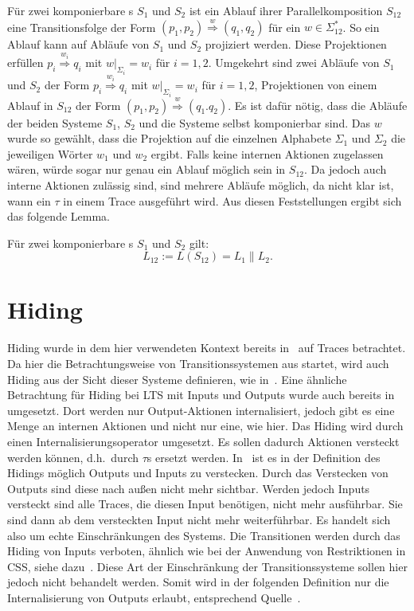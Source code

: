 Für zwei komponierbare \EIO{}s $S_1$ und $S_2$ ist ein Ablauf ihrer
Parallelkomposition $S_{12}$ eine Transitionsfolge der Form $(p_1,p_2)
\overset{w}{\Rightarrow} (q_1,q_2)$ für ein $w\in\Sigma_{12}^*$. So ein Ablauf
kann auf Abläufe von $S_1$ und $S_2$ projiziert werden. Diese Projektionen
erfüllen $p_i \overset{w_i}{\Rightarrow} q_i$ mit $w|_{\Sigma
_i}=w_i$ für $i=1,2$. Umgekehrt sind zwei Abläufe von $S_1$ und $S_2$ der Form
$p_i \overset{w_i}{\Rightarrow} q_i$ mit $w| _{\Sigma _i}= w_i$ für $i=1,2$,
Projektionen von einem Ablauf in $S_{12}$ der Form $(p_1,p_2)
\overset{w}{\Rightarrow} (q_1.q_2)$. Es ist dafür nötig, dass die Abläufe der
beiden Systeme $S_1$, $S_2$ und die Systeme selbst komponierbar sind. Das $w$ wurde so
gewählt, dass die Projektion auf die einzelnen Alphabete $\Sigma _1$ und $\Sigma
_2$ die jeweiligen Wörter $w_1$ und $w_2$ ergibt. Falls keine internen Aktionen
zugelassen wären, würde sogar nur genau ein Ablauf möglich sein in $S_{12}$. Da
jedoch auch interne Aktionen zulässig sind, sind mehrere Abläufe möglich, da
nicht klar ist, wann ein $\tau$ in einem Trace ausgeführt wird. Aus diesen
Feststellungen ergibt sich das folgende Lemma.

\begin{lem}
\label{LemmaSprache}
  Für zwei komponierbare \EIO{}s $S_1$ und $S_2$ gilt: \[L_{12} := L(S_{12}) =
  L_1\|L_2.\]
\end{lem}

\section{Hiding}

Hiding wurde in dem hier verwendeten Kontext bereits in~\cite{Chilton2013} auf
Traces betrachtet. Da hier die Betrachtungsweise von Transitionssystemen aus
startet, wird auch Hiding aus der Sicht dieser Systeme definieren, wie
in~\cite{Schlosser2012BA}. Eine ähnliche Betrachtung für Hiding bei LTS mit
Inputs und Outputs wurde auch bereits in~\cite{Lynch1996} umgesetzt. Dort
werden nur Output-Aktionen internalisiert, jedoch gibt es eine Menge an
internen Aktionen und nicht nur eine, wie hier. Das Hiding wird durch einen
Internalisierungsoperator umgesetzt. Es sollen dadurch Aktionen versteckt
werden können, d.h.\ durch $\tau$s ersetzt werden. In~\cite{Chilton2013} ist es
in der Definition des Hidings möglich Outputs und Inputs zu verstecken. Durch
das Verstecken von Outputs sind diese nach außen nicht mehr sichtbar. Werden
jedoch Inputs versteckt sind alle Traces, die diesen Input benötigen, nicht
mehr ausführbar. Sie sind dann ab dem versteckten Input nicht mehr
weiterführbar. Es handelt sich also um echte Einschränkungen des Systems. Die
Transitionen werden durch das Hiding von Inputs verboten, ähnlich wie bei der Anwendung
von Restriktionen in CSS, siehe dazu~\cite{Milner1989}. Diese Art der
Einschränkung der Transitionssysteme sollen hier jedoch nicht behandelt werden.
Somit wird in der folgenden Definition nur die Internalisierung von Outputs
erlaubt, entsprechend Quelle~\cite{Schlosser2012BA}.

